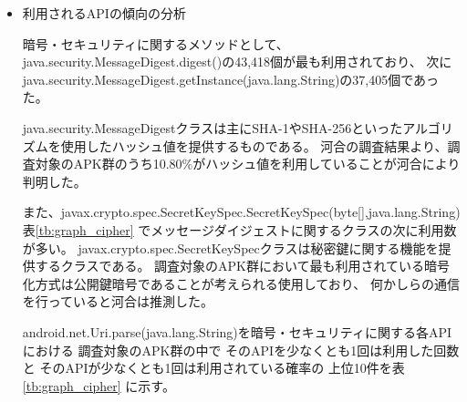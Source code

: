 \begin{itemize}
\item 利用されるAPIの傾向の分析


暗号・セキュリティに関するメソッドとして、
java.security.MessageDigest.digest()の43,418個が最も利用されており、
次にjava.security.MessageDigest.getInstance(java.lang.String)の37,405個であった。

java.security.MessageDigestクラスは主にSHA-1やSHA-256といったアルゴリズムを使用したハッシュ値を提供するものである。
河合の調査結果より、調査対象のAPK群のうち10.80\%がハッシュ値を利用していることが河合により判明した。


また、javax.crypto.spec.SecretKeySpec.SecretKeySpec(byte[],java.lang.String)表\ref{tb:graph_cipher}
でメッセージダイジェストに関するクラスの次に利用数が多い。
javax.crypto.spec.SecretKeySpecクラスは秘密鍵に関する機能を提供するクラスである。
調査対象のAPK群において最も利用されている暗号化方式は公開鍵暗号であることが考えられる使用しており、
何かしらの通信を行っていると河合は推測した。

android.net.Uri.parse(java.lang.String)を暗号・セキュリティに関する各APIにおける
調査対象のAPK群の中で
そのAPIを少なくとも1回は利用した回数と
そのAPIが少なくとも1回は利用されている確率の
上位10件を表\ref{tb:graph_cipher}
に示す。


\end{itemize}


